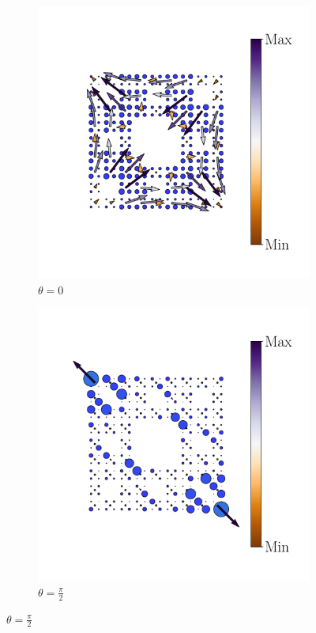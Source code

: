 \begin{figure}[h!]
\begin{minipage}[h!]{1.1\textwidth}
\begin{subfigure}[b!]{0.2 \textwidth}
         \end{subfigure}\hspace*{-0.5em}
          \begin{subfigure}[b!]{0.2 \textwidth}
             \caption*{$\theta = 0$}
             \includegraphics[width=\textwidth]{Imagenes/Resultados_pump_Fractal/xy/hoti_pomp_xy_neg3.pdf}
         \end{subfigure}\hspace*{-0.5em}
          \begin{subfigure}[b!]{0.2 \textwidth}
             \caption*{$\theta = \frac{\pi}{2}$}
             \includegraphics[width=\textwidth]{Imagenes/Resultados_pump_Fractal/xy/hoti_pomp_xy_neg4.pdf}

\end{subfigure}
\end{minipage}
\end{figure}
